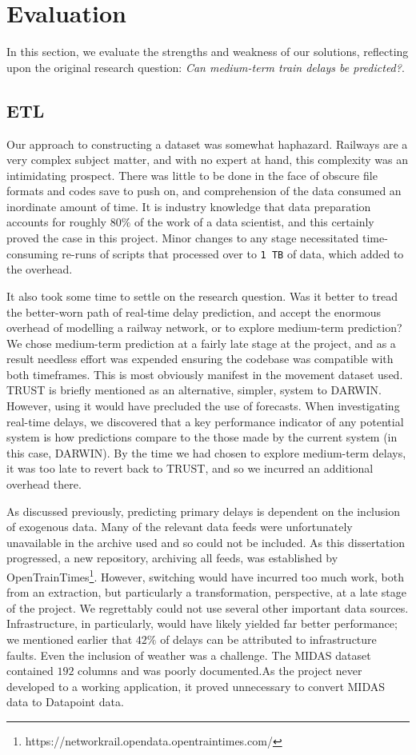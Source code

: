 \documentclass[12pt,a4paper]{article}
\begin{document}
\section{Evaluation}

In this section, we evaluate the strengths and weakness of our solutions, reflecting upon the original research question: \textit{Can medium-term train delays be predicted?}.

\subsection{ETL}

Our approach to constructing a dataset was somewhat haphazard. Railways are a very complex subject matter, and with no expert at hand, this complexity was an intimidating prospect. There was little to be done in the face of obscure file formats and codes save to push on, and comprehension of the data consumed an inordinate amount of time.  It is industry knowledge that data preparation accounts for roughly $80\%$ of the work of a data scientist, and this certainly proved the case in this project. Minor changes to any stage necessitated time-consuming re-runs of scripts that processed over to \verb|1 TB| of data, which added to the overhead. 

It also took some time to settle on the research question. Was it better to tread the better-worn path of real-time delay prediction, and accept the enormous overhead of modelling a railway network, or to explore medium-term prediction? We chose medium-term prediction at a fairly late stage at the project, and as a result needless effort was expended ensuring the codebase was compatible with both timeframes. This is most obviously manifest in the movement dataset used. TRUST is briefly mentioned as an alternative, simpler, system to DARWIN. However, using it would have precluded the use of forecasts. When investigating real-time delays, we discovered that a key performance indicator of any potential system is how predictions compare to the those made by the current system (in this case, DARWIN). By the time we had chosen to explore medium-term delays, it was too late to revert back to TRUST, and so we incurred an additional overhead there. 

As discussed previously, predicting primary delays is dependent on the inclusion of exogenous data. Many of the relevant data feeds were unfortunately unavailable in the archive used and so could not be included. As this dissertation progressed, a new repository, archiving all feeds, was established by OpenTrainTimes\footnote{https://networkrail.opendata.opentraintimes.com/}. However, switching would have incurred too much work, both from an extraction, but particularly a transformation, perspective, at a late stage of the project. We regrettably could not use several other important data sources. Infrastructure, in particularly, would have likely yielded far better performance; we mentioned earlier that $42\%$ of delays can be attributed to infrastructure faults. Even the inclusion of weather was a challenge. The MIDAS dataset contained $192$ columns and was poorly documented.As the project never developed to a working application, it proved unnecessary to convert MIDAS data to Datapoint data.
\end{document}
